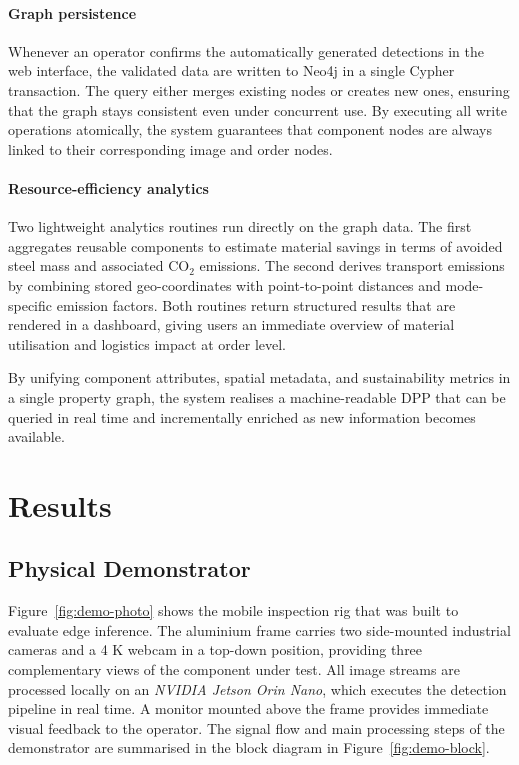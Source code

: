 \documentclass[3p,times,procedia]{elsarticle}
\begin{document}
\paragraph{Graph persistence}
Whenever an operator confirms the automatically generated detections in the web interface, the validated data are written to Neo4j in a single Cypher transaction.  The query either merges existing nodes or creates new ones, ensuring that the graph stays consistent even under concurrent use.  By executing all write operations atomically, the system guarantees that component nodes are always linked to their corresponding image and order nodes.

\paragraph{Resource-efficiency analytics}
Two lightweight analytics routines run directly on the graph data.  The first aggregates reusable components to estimate material savings in terms of avoided steel mass and associated CO\(_2\) emissions.  The second derives transport emissions by combining stored geo-coordinates with point-to-point distances and mode-specific emission factors.  Both routines return structured results that are rendered in a dashboard, giving users an immediate overview of material utilisation and logistics impact at order level.

By unifying component attributes, spatial metadata, and sustainability metrics in a single property graph, the system realises a machine-readable DPP that can be queried in real time and incrementally enriched as new information becomes available.

\section{Results}
\label{sec:results}

\subsection{Physical Demonstrator}
\label{sec:results-demonstrator}

Figure~\ref{fig:demo-photo} shows the mobile inspection rig that was built to evaluate edge inference.  
The aluminium frame carries two side-mounted industrial cameras and a 4 K webcam in a top-down position, providing three complementary views of the component under test.  
All image streams are processed locally on an \emph{NVIDIA Jetson Orin Nano}, which executes the detection pipeline in real time.  
A monitor mounted above the frame provides immediate visual feedback to the operator. The signal flow and main processing steps of the demonstrator are summarised in the block diagram in Figure~\ref{fig:demo-block}.
\end{document}

